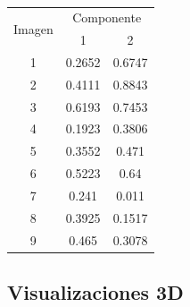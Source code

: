 \begin{table}[H]
    \centering
    \begin{tabular}{ccc} \hline
        \multirow{2}{*}{Imagen} & \multicolumn{2}{c}{Componente}          \\
                                & 1                              & 2      \\ \hline
        1                       & 0.2652                         & 0.6747 \\
        2                       & 0.4111                         & 0.8843 \\
        3                       & 0.6193                         & 0.7453 \\
        4                       & 0.1923                         & 0.3806 \\
        5                       & 0.3552                         & 0.471  \\
        6                       & 0.5223                         & 0.64   \\
        7                       & 0.241                          & 0.011  \\
        8                       & 0.3925                         & 0.1517 \\
        9                       & 0.465                          & 0.3078 \\ \hline
    \end{tabular}
    \caption{}
\end{table}

\subsection*{Visualizaciones 3D}

